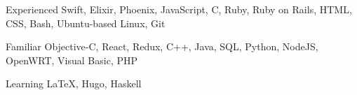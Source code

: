 

\begin{cvskills}

  \cvskill
    {Experienced} %
    {Swift, Elixir, Phoenix, JavaScript, C, Ruby, Ruby on Rails, HTML, CSS, Bash, Ubuntu-based Linux, Git} %

  \cvskill
    {Familiar} %
    {Objective-C, React, Redux, C++, Java, SQL, Python, NodeJS, OpenWRT, Visual Basic, PHP} %
    
  \cvskill
    {Learning} %
    {\LaTeX, Hugo, Haskell} %
    


\end{cvskills}
